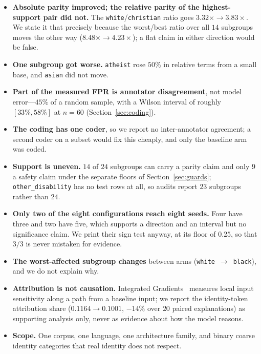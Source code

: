 \documentclass[conference]{IEEEtran}
\begin{document}
\begin{itemize}
\item \textbf{Absolute parity improved; the relative parity of the
      highest-support pair did not.} The \texttt{white}/\texttt{christian} ratio
      goes $3.32\times \rightarrow 3.83\times$. We state it that precisely
      because the worst/best ratio over all $14$ subgroups moves the other way
      ($8.48\times \rightarrow 4.23\times$); a flat claim in either direction
      would be false.
\item \textbf{One subgroup got worse.} \texttt{atheist} rose $50\%$ in relative
      terms from a small base, and \texttt{asian} did not move.
\item \textbf{Part of the measured FPR is annotator disagreement}, not model
      error---$45\%$ of a random sample, with a Wilson interval of roughly
      $[33\%, 58\%]$ at $n = 60$ (Section~\ref{sec:coding}).
\item \textbf{The coding has one coder}, so we report no inter-annotator
      agreement; a second coder on a subset would fix this cheaply, and only the
      baseline arm was coded.
\item \textbf{Support is uneven.} $14$ of $24$ subgroups can carry a parity claim
      and only $9$ a safety claim under the separate floors of
      Section~\ref{sec:guards}; \texttt{other\_disability} has no test rows at
      all, so audits report $23$ subgroups rather than $24$.
\item \textbf{Only two of the eight configurations reach eight seeds.} Four have
      three and two have five, which supports a direction and an interval but no
      significance claim. We print their sign test anyway, at its floor of
      $0.25$, so that $3/3$ is never mistaken for evidence.
\item \textbf{The worst-affected subgroup changes} between arms
      (\texttt{white}~$\rightarrow$~\texttt{black}), and we do not explain why.
\item \textbf{Attribution is not causation.} Integrated
      Gradients~\cite{sundararajan2017} measures local input sensitivity along a
      path from a baseline input; we report the identity-token attribution share
      ($0.1164 \rightarrow 0.1001$, $-14\%$ over $20$ paired explanations) as
      supporting analysis only, never as evidence about how the model reasons.
\item \textbf{Scope.} One corpus, one language, one architecture family, and
      binary coarse identity categories that real identity does not respect.
\end{itemize}
\end{document}
